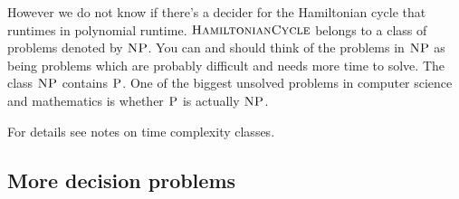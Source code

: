 However we do not know if there's a decider for the
Hamiltonian cycle that
runtimes in polynomial runtime.
$\textsc{HamiltonianCycle}$ belongs to a class of problems
denoted by $\textsc{NP}$.
You can and should think of the problems in
$\textsc{NP}$ as being
problems which are probably difficult and needs
more time to solve.
The class $\textsc{NP}$ contains $\textsc{P}$.
One of the biggest unsolved problems in computer science
and mathematics
is whether $\textsc{P}$ is actually $\textsc{NP}$.

For details see notes on time complexity classes.


\newpage
\subsection{More decision problems}








